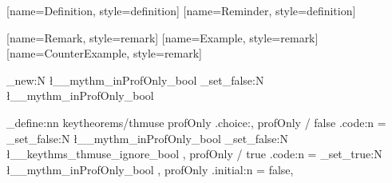 		[name=Definition, style=definition]
		[name=Reminder, style=definition]

		[name=Remark, style=remark]
		[name=Example, style=remark]
		[name=CounterExample, style=remark]



	\ExplSyntaxOn

		\bool_new:N \l__mythm_inProfOnly_bool
		\bool_set_false:N \l__mythm_inProfOnly_bool

		\keys_define:nn { keytheorems/thmuse }
		{
			profOnly  .choice:,
			profOnly / false .code:n = {
				\bool_set_false:N \l__mythm_inProfOnly_bool
				\bool_set_false:N \l__keythms_thmuse_ignore_bool
			},
			profOnly / true .code:n = {
				\bool_set_true:N \l__mythm_inProfOnly_bool
			},
			profOnly  .initial:n = false,
		}
	\ExplSyntaxOff





		\renewcommand\thesubvideo{\alph{subvideo}}
	\usepackage{animate} %

